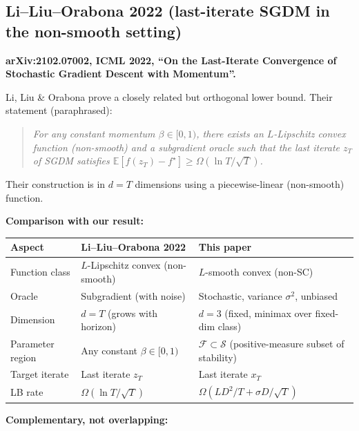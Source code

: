 \documentclass[11pt]{article}
\theoremstyle{definition}
\theoremstyle{remark}
\begin{document}
\subsection{Li--Liu--Orabona 2022 (last-iterate SGDM in the non-smooth setting)}

\textbf{arXiv:2102.07002, ICML 2022, ``On the Last-Iterate Convergence of Stochastic Gradient Descent with Momentum''.}

Li, Liu \& Orabona prove a closely related but orthogonal lower bound. Their statement (paraphrased):

\begin{quote}
\emph{For any constant momentum $\beta \in [0,1)$, there exists an $L$-Lipschitz convex function (non-smooth) and a subgradient oracle such that the last iterate $z_T$ of SGDM satisfies $\mathbb{E}[f(z_T) - f^\star] \geq \Omega(\ln T / \sqrt T)$.}
\end{quote}

Their construction is in $d = T$ dimensions using a piecewise-linear (non-smooth) function.

\textbf{Comparison with our result:}

\begin{center}
\small
\begin{tabular}{p{}p{}p{}}
\toprule
Aspect & Li--Liu--Orabona 2022 & This paper \\
\midrule
Function class & $L$-Lipschitz convex (non-smooth) & $L$-smooth convex (non-SC) \\
Oracle & Subgradient (with noise) & Stochastic, variance $\sigma^2$, unbiased \\
Dimension & $d = T$ (grows with horizon) & $d = 3$ (fixed, minimax over fixed-dim class) \\
Parameter region & Any constant $\beta \in [0,1)$ & $\mathcal{F} \subset \mathcal{S}$ (positive-measure subset of stability) \\
Target iterate & Last iterate $z_T$ & Last iterate $x_T$ \\
LB rate & $\Omega(\ln T / \sqrt T)$ & $\Omega(LD^2/T + \sigma D/\sqrt T)$ \\
\bottomrule
\end{tabular}
\end{center}

\textbf{Complementary, not overlapping:}
\end{document}
